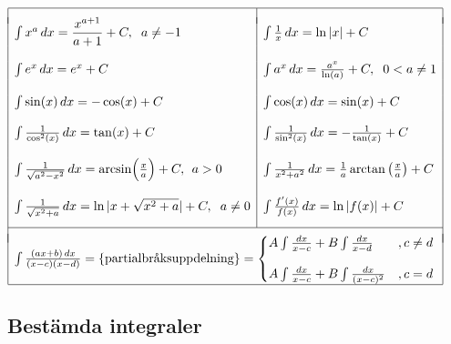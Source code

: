 \documentclass{article}
\begin{document}
$\begin{array}{|l|l|}\hline   & \\*[-5pt]
\int x^a\,dx=\dfrac{x^{a+1}}{a+1}+C, \hspace{2 mm} a\neq -1 & \int\frac{1}{x}\,dx=\ln\vert x\vert +C \\ & \\ \int e^x\,dx=e^x+C &\int a^x\,dx=\frac{a^x}{\ln(a)}+C, \hspace{2 mm} 0<a\neq 1 \\ & \\ \int \sin(x)\,dx=-\cos(x)+C &\int\cos(x)\,dx=\sin(x)+C \\ & \\ \int \frac{1}{\cos^2(x)}\,dx=\tan(x)+C &\int\frac{1}{\sin^2(x)}\,dx=-\frac{1}{\tan(x)}+C \\ & \\ \int\frac{1}{\sqrt{a^2-x^2}}\,dx=\arcsin\Bigl(\frac xa\Bigr)+C,\;\, a>0 &\int\frac{1}{x^2+a^2}\,dx=\frac{1}{a}\arctan\left(\frac{x}{a}\right)+C\\ &\\ \int\frac{1}{\sqrt{x^2+a}}\,dx=\ln\vert x+\sqrt{x^2+a}\vert+C,\hspace{2 mm}a\neq 0 &\int\frac{f'(x)}{f(x)}\,dx=\ln\vert f(x)\vert +C 
\\*[10pt]
\cline{1-2}
\multicolumn{2}{|l|}{}\\*[-7pt]
\multicolumn{2}{|l|}{

\int\frac{(ax+b)\,dx}{(x-c)(x-d)}
=\{\text{partialbråksuppdelning}\}=
\begin{cases}

A\int\frac{dx}{x-c} +B\int\frac{dx}{x-d} &, c\neq d \\*[10pt]

A\int\frac{dx}{x-c} +B\int\frac{dx}{(x-c)^2} &, c=d
\end{cases}
}\\
\hline
\end{array}
$

\subsection*{Bestämda integraler}%
\end{document}
